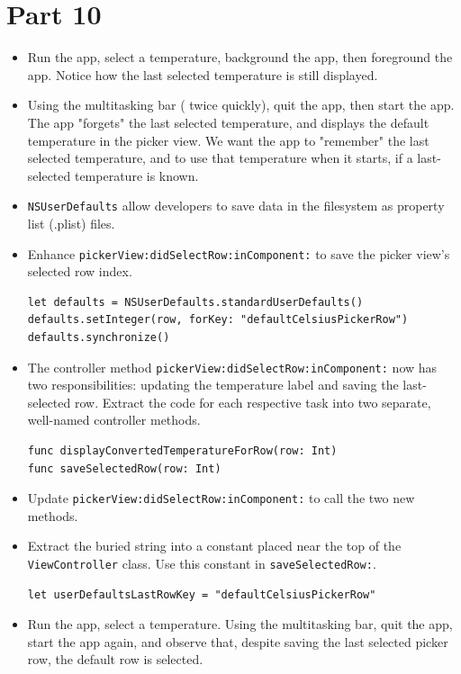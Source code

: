 \documentclass[a4paper,11pt]{scrartcl}
\begin{document}
\section*{Part 10}

\begin{itemize}
\item Run the app, select a temperature, background the app, then foreground the app. Notice how the last selected temperature is still displayed.
\item Using the multitasking bar ( twice quickly), quit the app, then start the app. The app "forgets" the last selected temperature, and displays the default temperature in the picker view. We want the app to "remember" the last selected temperature, and to use that temperature when it starts, if a last-selected temperature is known.
\item \texttt{NSUserDefaults} allow developers to save data in the filesystem as property list (.plist) files.
\item Enhance \texttt{pickerView:didSelectRow:inComponent:} to save the picker view's selected row index.
\begin{lstlisting}
let defaults = NSUserDefaults.standardUserDefaults()
defaults.setInteger(row, forKey: "defaultCelsiusPickerRow")
defaults.synchronize()
\end{lstlisting}
\item The controller method \texttt{pickerView:didSelectRow:inComponent:} now has two responsibilities: updating the temperature label and saving the last-selected row. Extract the code for each respective task into two separate, well-named controller methods.
\begin{lstlisting}
func displayConvertedTemperatureForRow(row: Int)
func saveSelectedRow(row: Int)
\end{lstlisting}
\item Update \texttt{pickerView:didSelectRow:inComponent:} to call the two new methods.
\item Extract the buried string into a constant placed near the top of the \texttt{ViewController} class. Use this constant in \texttt{saveSelectedRow:}.
\begin{lstlisting}
let userDefaultsLastRowKey = "defaultCelsiusPickerRow"
\end{lstlisting}
\item Run the app, select a temperature. Using the multitasking bar, quit the app, start the app again, and observe that, despite saving the last selected picker row, the default row is selected.
\end{itemize}
\end{document}
